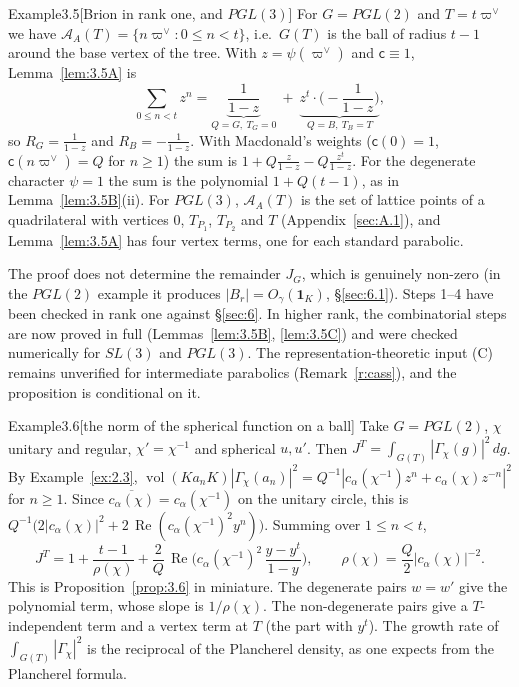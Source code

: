 \documentclass[12pt,letterpaper]{article}
\numberwithin{equation}{section}
\theoremstyle{plain}
\theoremstyle{remark}
\theoremstyle{plain}
\theoremstyle{definition}
\theoremstyle{remark}
\theoremstyle{remark}
\newcommand{\cA}{\mathcal{A}}
\DeclareMathOperator{\vol}{vol}
\newcommand{\one}{\mathbf 1}
\begin{document}
\begin{fixedrem}{Example}{3.5}[Brion in rank one, and $PGL(3)$]\label{ex:3.5}
For $G=PGL(2)$ and $T=t\varpi^\vee$ we have $\cA_A(T)=\{n\varpi^\vee:0\le n<t\}$, i.e.\ $G(T)$ is the ball of radius $t-1$ around the base vertex of the tree. With $z=\psi(\varpi^\vee)$ and $\mathsf c\equiv1$, Lemma~\ref{lem:3.5A} is
\[
\sum_{0\le n<t}z^n=\underbrace{\frac1{1-z}}_{Q=G,\ T_G=0}\ +\ \underbrace{z^t\cdot\Big(-\frac1{1-z}\Big)}_{Q=B,\ T_B=T},
\]
so $R_G=\frac1{1-z}$ and $R_B=-\frac1{1-z}$. With Macdonald's weights ($\mathsf c(0)=1$, $\mathsf c(n\varpi^\vee)=Q$ for $n\ge1$) the sum is $1+Q\frac{z}{1-z}-Q\frac{z^t}{1-z}$. For the degenerate character $\psi=1$ the sum is the polynomial $1+Q(t-1)$, as in Lemma~\ref{lem:3.5B}(ii). For $PGL(3)$, $\cA_A(T)$ is the set of lattice points of a quadrilateral with vertices $0$, $T_{P_1}$, $T_{P_2}$ and $T$ (Appendix~\ref{sec:A.1}), and Lemma~\ref{lem:3.5A} has four vertex terms, one for each standard parabolic.
\end{fixedrem}

\begin{rem26}\label{r:P36}
The proof does not determine the remainder $J_G$, which is genuinely non-zero (in the $PGL(2)$ example it produces $|B_r|=O_\gamma(\one_K)$, \S\ref{sec:6.1}). Steps 1--4 have been checked in rank one against \S\ref{sec:6}. In higher rank, the combinatorial steps are now proved in full (Lemmas~\ref{lem:3.5B}, \ref{lem:3.5C}) and were checked numerically for $SL(3)$ and $PGL(3)$. The representation-theoretic input (C) remains unverified for intermediate parabolics (Remark~\ref{r:cass}), and the proposition is conditional on it.
\end{rem26}

\begin{fixedrem}{Example}{3.6}[the norm of the spherical function on a ball]\label{ex:3.6}
Take $G=PGL(2)$, $\chi$ unitary and regular, $\chi'=\chi^{-1}$ and spherical $u,u'$. Then $J^T=\int_{G(T)}|\Gamma_\chi(g)|^2\,dg$. By Example~\ref{ex:2.3}, $\vol(Ka_nK)|\Gamma_\chi(a_n)|^2=Q^{-1}|c_\alpha(\chi^{-1})z^n+c_\alpha(\chi)z^{-n}|^2$ for $n\ge1$. Since $\overline{c_\alpha(\chi)}=c_\alpha(\chi^{-1})$ on the unitary circle, this is $Q^{-1}\big(2|c_\alpha(\chi)|^2+2\,\operatorname{Re}(c_\alpha(\chi^{-1})^2y^n)\big)$. Summing over $1\le n<t$,
\[
J^T=1+\frac{t-1}{\rho(\chi)}+\frac2Q\,\operatorname{Re}\Big(c_\alpha(\chi^{-1})^2\,\frac{y-y^t}{1-y}\Big),\qquad\rho(\chi)=\frac Q2|c_\alpha(\chi)|^{-2}.
\]
This is Proposition~\ref{prop:3.6} in miniature. The degenerate pairs $w=w'$ give the polynomial term, whose slope is $1/\rho(\chi)$. The non-degenerate pairs give a $T$-independent term and a vertex term at $T$ (the part with $y^t$). The growth rate of $\int_{G(T)}|\Gamma_\chi|^2$ is the reciprocal of the Plancherel density, as one expects from the Plancherel formula.
\end{fixedrem}
\end{document}
